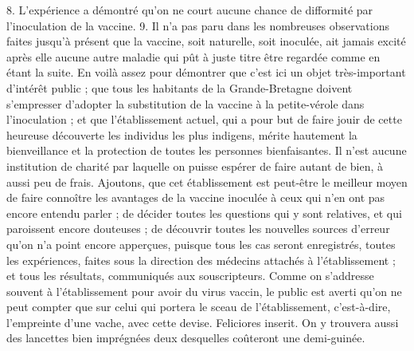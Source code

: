 8. L'expérience a démontré qu'on ne court aucune chance de difformité par l'inoculation de la vaccine.
9. Il n'a pas paru dans les nombreuses observations faites jusqu'à présent que la vaccine, soit naturelle, soit inoculée, ait jamais excité après elle aucune autre maladie qui pût à juste titre être regardée comme en étant la suite.
En voilà assez pour démontrer que c'est\setcounter{page}{272} ici un objet très-important d'intérêt public ; que tous les habitants de la Grande-Bretagne doivent s'empresser d'adopter la substitution de la vaccine à la petite-vérole dans l'inoculation ; et que l'établissement actuel, qui a pour but de faire jouir de cette heureuse découverte les individus les plus indigens, mérite hautement la bienveillance et la protection de toutes les personnes bienfaisantes. Il n'est aucune institution de charité par laquelle on puisse espérer de faire autant de bien, à aussi peu de frais.
Ajoutons, que cet établissement est peut-être le meilleur moyen de faire connoître les avantages de la vaccine inoculée à ceux qui n'en ont pas encore entendu parler ; de décider toutes les questions qui y sont relatives, et qui paroissent encore douteuses ; de découvrir toutes les nouvelles sources d'erreur qu'on n'a point encore apperçues, puisque tous les cas seront enregistrés, toutes les expériences, faites sous la direction des médecins attachés à l'établissement ; et tous les résultats, communiqués aux souscripteurs.
Comme on s'addresse souvent à l'établissement pour avoir du virus vaccin, le public est averti qu'on ne peut compter que sur celui qui portera le sceau de l'établissement, c'est-à-dire, l'empreinte d'une vache, avec cette\setcounter{page}{273} devise. Feliciores inserit. On y trouvera aussi des lancettes bien imprégnées deux desquelles coûteront une demi-guinée.
